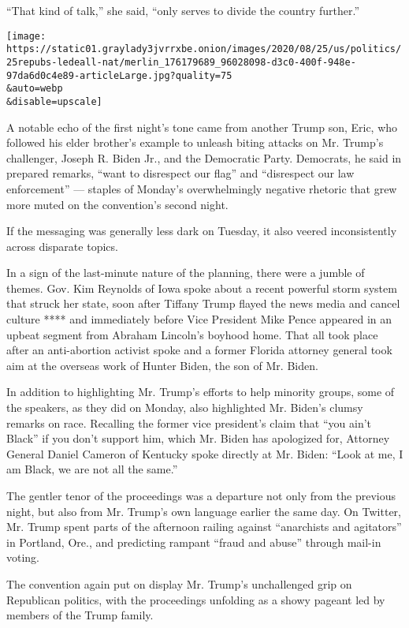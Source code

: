 ``That kind of talk,'' she said, ``only serves to divide the country
further.''

\texttt{[image: https://static01.graylady3jvrrxbe.onion/images/2020/08/25/us/politics/25repubs-ledeall-nat/merlin\_176179689\_96028098-d3c0-400f-948e-97da6d0c4e89-articleLarge.jpg?quality=75\\\&auto=webp\\\&disable=upscale]}

A notable echo of the first night's tone came from another Trump son,
Eric, who followed his elder brother's example to unleash biting attacks
on Mr. Trump's challenger, Joseph R. Biden Jr., and the Democratic
Party. Democrats, he said in prepared remarks, ``want to disrespect our
flag'' and ``disrespect our law enforcement'' --- staples of Monday's
overwhelmingly negative rhetoric that grew more muted on the
convention's second night.

If the messaging was generally less dark on Tuesday, it also veered
inconsistently across disparate topics.

In a sign of the last-minute nature of the planning, there were a jumble
of themes. Gov. Kim Reynolds of Iowa spoke about a recent powerful storm
system that struck her state, soon after Tiffany Trump flayed the news
media and cancel culture **** and immediately before Vice President Mike
Pence appeared in an upbeat segment from Abraham Lincoln's boyhood home.
That all took place after an anti-abortion activist spoke and a former
Florida attorney general took aim at the overseas work of Hunter Biden,
the son of Mr. Biden.

In addition to highlighting Mr. Trump's efforts to help minority groups,
some of the speakers, as they did on Monday, also highlighted Mr.
Biden's clumsy remarks on race. Recalling the former vice president's
claim that ``you ain't Black'' if you don't support him, which Mr. Biden
has apologized for, Attorney General Daniel Cameron of Kentucky spoke
directly at Mr. Biden: ``Look at me, I am Black, we are not all the
same.''

The gentler tenor of the proceedings was a departure not only from the
previous night, but also from Mr. Trump's own language earlier the same
day. On Twitter, Mr. Trump spent parts of the afternoon railing against
``anarchists and agitators'' in Portland, Ore., and predicting rampant
``fraud and abuse'' through mail-in voting.

The convention again put on display Mr. Trump's unchallenged grip on
Republican politics, with the proceedings unfolding as a showy pageant
led by members of the Trump family.

